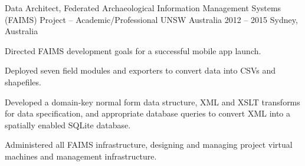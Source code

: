 \begin{cventries}
\cventry
    {Data Architect, Federated Archaeological Information Management Systems (FAIMS) Project -- Academic/Professional} %
    {UNSW Australia} %
    {2012 -- 2015} %
    {Sydney, Australia} %
    {\begin{cvitems}%
    \item {Directed FAIMS development goals for a successful mobile app launch.}
    \item {Deployed seven field modules and exporters to convert data into CSVs and shapefiles.}
    \item {Developed a domain-key normal form data structure, XML and XSLT transforms for data specification, and appropriate database queries to convert XML into a spatially enabled SQLite database.}
    \item {Administered all FAIMS infrastructure, designing and managing project virtual machines and management infrastructure.}
    \end{cvitems}}   



    

\end{cventries}
